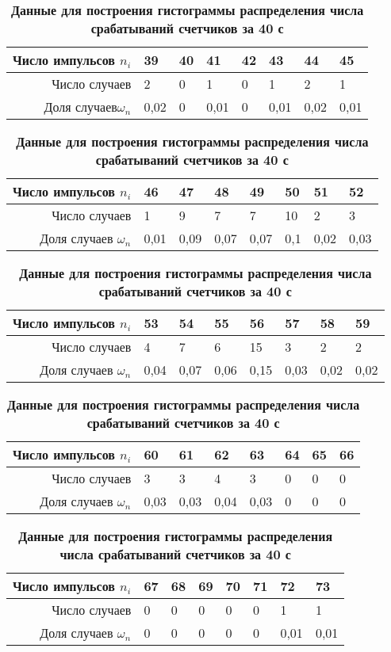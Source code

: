 \documentclass[a4paper, 10pt]{article}%
\begin{document}
\begin{table}
\caption{\textbf{Данные для построения гистограммы распределения числа срабатываний счетчиков за 40 с}}
\begin{tabular}{|r|p{1cm}|p{1cm}|p{1cm}|p{1cm}|p{1cm}|p{1cm}|p{1cm}|}
\hline
Число импульсов $n_i$&39&40&41&42&43&44&45\\ 
\hline
Число случаев&2&0&1&0&1&2&1\\ 
\hline
Доля случаев$\omega_n$&0,02&0&0,01&0&0,01&0,02&0,01\\ 
\hline
\end{tabular}
\begin{tabular}{|r|p{1cm}|p{1cm}|p{1cm}|p{1cm}|p{1cm}|p{1cm}|p{1cm}|}
\hline
Число импульсов $n_i$&46&47&48&49&50&51&52\\ 
\hline
Число случаев&1&9&7&7&10&2&3\\ 
\hline
Доля случаев $\omega_n$&0,01&0,09&0,07&0,07&0,1&0,02&0,03\\ 
\hline
\end{tabular}
\begin{tabular}{|r|p{1cm}|p{1cm}|p{1cm}|p{1cm}|p{1cm}|p{1cm}|p{1cm}|}
\hline
Число импульсов $n_i$&53&54&55&56&57&58&59\\ 
\hline
Число случаев&4&7&6&15&3&2&2\\ 
\hline
Доля случаев $\omega_n$&0,04&0,07&0,06&0,15&0,03&0,02&0,02\\
\hline 
\end{tabular}
\begin{tabular}{|r|p{1cm}|p{1cm}|p{1cm}|p{1cm}|p{1cm}|p{1cm}|p{1cm}|}
\hline
Число импульсов $n_i$&60&61&62&63&64&65&66\\ 
\hline
Число случаев&3&3&4&3&0&0&0\\ 
\hline
Доля случаев $\omega_n$&0,03&0,03&0,04&0,03&0&0&0\\
\hline
\end{tabular}
\begin{tabular}{|r|p{1cm}|p{1cm}|p{1cm}|p{1cm}|p{1cm}|p{1cm}|p{1cm}|}
\hline
Число импульсов $n_i$&67&68&69&70&71&72&73\\
\hline
Число случаев&0&0&0&0&0&1&1\\
\hline
Доля случаев $\omega_n$&0&0&0&0&0&0,01&0,01\\
\hline
\end{tabular}
\end{table}
\end{document}
